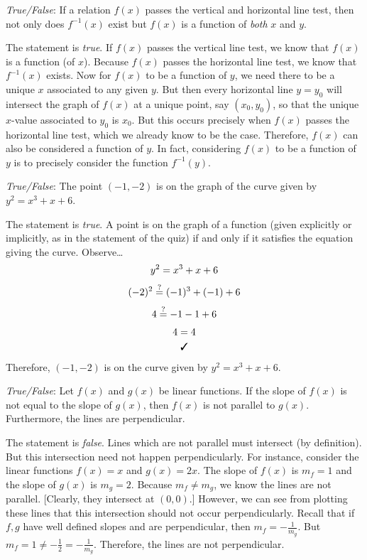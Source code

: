 \documentclass[11pt,letterpaper]{article}
\begin{document}
\quizsol \textit{True/False}: If a relation $f(x)$ passes the vertical and horizontal line test, then not only does $f^{-1}(x)$ exist but $f(x)$ is a function of \textit{both} $x$ and $y$. \pspace

\sol The statement is \textit{true}. If $f(x)$ passes the vertical line test, we know that $f(x)$ is a function (of $x$). Because $f(x)$ passes the horizontal line test, we know that $f^{-1}(x)$ exists. Now for $f(x)$ to be a function of $y$, we need there to be a unique $x$ associated to any given $y$. But then every horizontal line $y= y_0$ will intersect the graph of $f(x)$ at a unique point, say $(x_0, y_0)$, so that the unique $x$-value associated to $y_0$ is $x_0$. But this occurs precisely when $f(x)$ passes the horizontal line test, which we already know to be the case. Therefore, $f(x)$ can also be considered a function of $y$. In fact, considering $f(x)$ to be a function of $y$ is to precisely consider the function $f^{-1}(y)$. \pvspace{0.8cm}



\quizsol \textit{True/False}: The point $(-1, -2)$ is on the graph of the curve given by $y^2= x^3 + x + 6$. \pspace

\sol The statement is \textit{true}. A point is on the graph of a function (given explicitly or implicitly, as in the statement of the quiz) if and only if it satisfies the equation giving the curve. Observe\dots
	\[
	\begin{gathered}
	y^2 = x^3 + x + 6 \\[0.1cm]
	(-2)^2 \stackrel{?}{=} (-1)^3 + (-1) + 6 \\[0.1cm]
	4 \stackrel{?}{=} -1 - 1 + 6 \\[0.1cm]
	4 = 4 \\
	\text{\cmark}
	\end{gathered}
	\]
Therefore, $(-1, -2)$ is on the curve given by $y^2= x^3 + x + 6$. 



\quizsol \textit{True/False}: Let $f(x)$ and $g(x)$ be linear functions. If the slope of $f(x)$ is not equal to the slope of $g(x)$, then $f(x)$ is not parallel to $g(x)$. Furthermore, the lines are perpendicular. \pspace

\sol The statement is \textit{false}. Lines which are not parallel must intersect (by definition). But this intersection need not happen perpendicularly. For instance, consider the linear functions $f(x)= x$ and $g(x)= 2x$. The slope of $f(x)$ is $m_f= 1$ and the slope of $g(x)$ is $m_g= 2$. Because $m_f \neq m_g$, we know the lines are not parallel. [Clearly, they intersect at $(0, 0)$.] However, we can see from plotting these lines that this intersection should not occur perpendicularly. Recall that if $f, g$ have well defined slopes and are perpendicular, then $m_f= -\frac{1}{m_g}$. But $m_f= 1 \neq -\frac{1}{2}= -\frac{1}{m_g}$. Therefore, the lines are not perpendicular. \pvspace{1.3cm}
\end{document}
